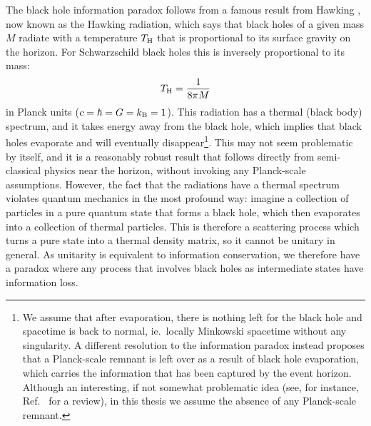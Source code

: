 \documentclass{brownthesis}
\begin{document}
The black hole information paradox follows from a famous result from Hawking \cite{PhysRevD.14.2460},
now known as the Hawking radiation, which says that black holes of a given mass $M$ radiate with
a temperature $T_{\rm H}$ that is proportional to its surface gravity on the horizon. For
Schwarzschild black holes this is inversely proportional to its mass:
\[
T_{\rm H} = \frac{1}{8\pi M}
\]
in Planck units ($c=\hbar = G = k_{\rm B} = 1$). This radiation has a thermal (black body)
spectrum, and it takes energy away from the black hole, which implies that black holes
evaporate and will eventually disappear\footnote{We assume that after evaporation, there is nothing left for the black hole
and spacetime is back to normal, ie.~locally Minkowski spacetime without any singularity.
A different resolution to the information paradox instead proposes that a Planck-scale
remnant is left over as a result of black hole evaporation, which carries the information that has
been captured by the event horizon. Although an interesting, if not somewhat problematic idea
(see, for instance, Ref.~\cite{Chen:2014jwq} for a review), in this thesis we assume the
absence of any Planck-scale remnant.}. This may not seem problematic by itself, and it is a reasonably robust result
that follows directly from semi-classical physics near the horizon, without invoking any
Planck-scale assumptions. However, the fact that the radiations have a thermal spectrum
violates quantum mechanics in the most profound way: imagine a collection of particles
in a pure quantum state that forms a black hole, which then evaporates into a collection
of thermal particles. This is therefore a scattering process which turns
a pure state into a thermal density matrix, so it cannot be unitary in general. As unitarity
is equivalent to information conservation, we therefore have a paradox where any process
that involves black holes as intermediate states have information loss.
\end{document}
